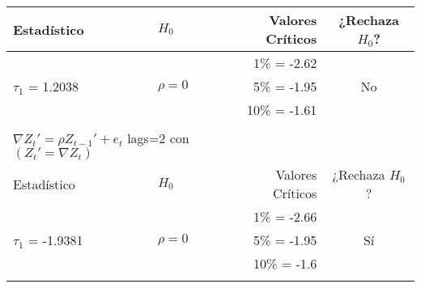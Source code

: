 \begin{table}[ht]
\begin{tabular}{llrc}
	\cline{1-2}
		Estadístico    			& $H_0$ 							& Valores Críticos 	& ¿Rechaza $H_0$? \\
		\hline
							&								& 1\%   = -2.62		&			\\
		 $\tau_1$ = 1.2038		& $\rho=0$			     			& 5\%   = -1.95		&       No		\\
							&  								& 10\% = -1.61		&       		\\
	\firsthline
							&								&				&			\\
	\multicolumn{2}{l}{$\nabla Z_t' = \rho Z_{t-1}' + e_t$ lags=2 con $(Z_t'=\nabla Z_t)$} \\
	\cline{1-2}
		Estadístico    			& $H_0$ 							& Valores Críticos 	& ¿Rechaza $H_0$? \\
		\hline
	\cline{1-4}				
							&								& 1\%   = -2.66		&			\\
		 $\tau_1$ = -1.9381		& $\rho=0$						& 5\%   = -1.95		&       Sí		\\
							&  								& 10\% = -1.6		&       		\\
	
							
	\lasthline
	\end{tabular}
\label{table:ISALUD}
\end{table}





